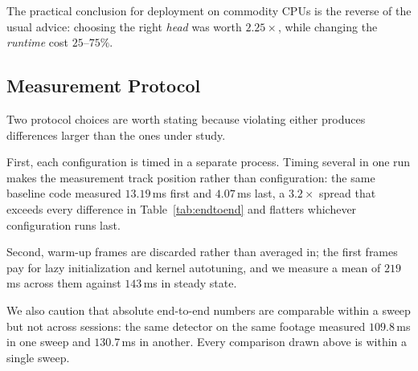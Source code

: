 The practical conclusion for deployment on commodity CPUs is the reverse of
the usual advice: choosing the right \emph{head} was worth $2.25\times$, while
changing the \emph{runtime} cost $25$--$75\%$.

\subsection{Measurement Protocol}
\label{subsec:protocol}

Two protocol choices are worth stating because violating either produces
differences larger than the ones under study.

First, each configuration is timed in a separate process.
Timing several in one run makes the measurement track position rather than
configuration: the same baseline code measured $13.19$\,ms first and
$4.07$\,ms last, a $3.2\times$ spread that exceeds every difference in
Table~\ref{tab:endtoend} and flatters whichever configuration runs last.

Second, warm-up frames are discarded rather than averaged in; the first frames
pay for lazy initialization and kernel autotuning, and we measure a mean of
$219$\,ms across them against $143$\,ms in steady state.

We also caution that absolute end-to-end numbers are comparable within a sweep
but not across sessions: the same detector on the same footage measured
$109.8$\,ms in one sweep and $130.7$\,ms in another.
Every comparison drawn above is within a single sweep.
